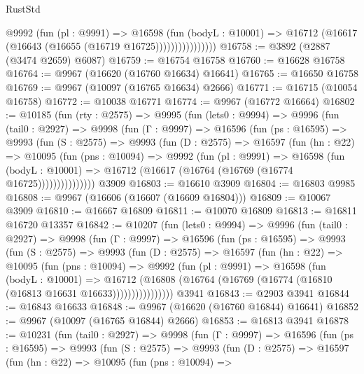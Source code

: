 \begin{lexlean}{RustStd}
\begin{coremodule}
                      @9992
                        (fun (pl : @9991) =>
                        @16598
                          (fun (bodyL : @10001) =>
                          @16712 (@16617 (@16643 (@16655 (@16719 @16725))))))))))))))))
@16758 := @3892 (@2887 (@3474 @2659) @6087)
@16759 := @16754 @16758
@16760 := @16628 @16758
@16764 := @9967 (@16620 (@16760 @16634) @16641)
@16765 := @16650 @16758
@16769 := @9967 (@10097 (@16765 @16634) @2666)
@16771 := @16715 (@10054 @16758)
@16772 := @10038 @16771
@16774 := @9967 (@16772 @16664)
@16802 := @10185
    (fun (rty : @2575) =>
    @9995
      (fun (lets0 : @9994) =>
      @9996
        (fun (tail0 : @2927) =>
        @9998
          (fun (Γ : @9997) =>
          @16596
            (fun (ps : @16595) =>
            @9993
              (fun (S : @2575) =>
              @9993
                (fun (D : @2575) =>
                @16597
                  (fun (hn : @22) =>
                  @10095
                    (fun (pns : @10094) =>
                    @9992
                      (fun (pl : @9991) =>
                      @16598
                        (fun (bodyL : @10001) =>
                        @16712 (@16617 (@16764 (@16769 (@16774 @16725)))))))))))))))
    @3909
@16803 := @16610 @3909
@16804 := @16803 @9985
@16808 := @9967 (@16606 (@16607 (@16609 @16804)))
@16809 := @10067 @3909
@16810 := @16667 @16809
@16811 := @10070 @16809
@16813 := @16811 @16720 @13357
@16842 := @10207
    (fun (lets0 : @9994) =>
    @9996
      (fun (tail0 : @2927) =>
      @9998
        (fun (Γ : @9997) =>
        @16596
          (fun (ps : @16595) =>
          @9993
            (fun (S : @2575) =>
            @9993
              (fun (D : @2575) =>
              @16597
                (fun (hn : @22) =>
                @10095
                  (fun (pns : @10094) =>
                  @9992
                    (fun (pl : @9991) =>
                    @16598
                      (fun (bodyL : @10001) =>
                      @16712
                        (@16808
                          (@16764 (@16769 (@16774 (@16810 (@16813 @16631 @16633))))))))))))))))
    @3941
@16843 := @2903 @3941
@16844 := @16843 @16633
@16848 := @9967 (@16620 (@16760 @16844) @16641)
@16852 := @9967 (@10097 (@16765 @16844) @2666)
@16853 := @16813 @3941
@16878 := @10231
    (fun (tail0 : @2927) =>
    @9998
      (fun (Γ : @9997) =>
      @16596
        (fun (ps : @16595) =>
        @9993
          (fun (S : @2575) =>
          @9993
            (fun (D : @2575) =>
            @16597
              (fun (hn : @22) =>
              @10095
                (fun (pns : @10094) =>

\end{coremodule}
\end{lexlean}
